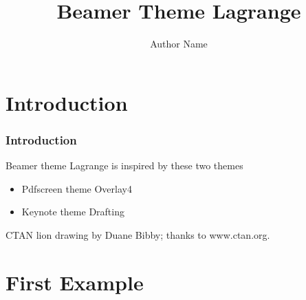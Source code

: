 \documentclass[11pt,xcolor={rgb}]{beamer}
\begin{document}
\title{Beamer Theme Lagrange}
\author{Author Name}

\begin{frame}[plain]
\titlepage
\end{frame}

\section{Introduction}

\begin{frame}
\frametitle{Introduction}
Beamer theme Lagrange is inspired by these two themes
\begin{itemize}
  \item Pdfscreen theme Overlay4
  \item Keynote theme Drafting
\end{itemize}
\vfill
CTAN lion drawing by Duane Bibby; thanks to www.ctan.org.
\end{frame}

\section{First Example}

\end{document}
